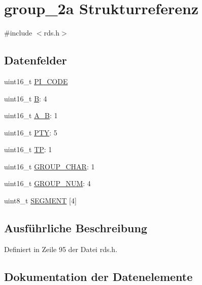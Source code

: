\hypertarget{structgroup__2a}{}\section{group\+\_\+2a Strukturreferenz}
\label{structgroup__2a}


{\ttfamily \#include $<$rds.\+h$>$}

\subsection*{Datenfelder}
\begin{DoxyCompactItemize}
\item 
uint16\+\_\+t \hyperlink{structgroup__2a_a5cd9b1f6413028425796c1129aa8fd87}{P\+I\+\_\+\+C\+O\+D\+E}
\item 
uint16\+\_\+t \hyperlink{structgroup__2a_ae783bd90764c8455228772c025c064e4}{B}\+: 4
\item 
uint16\+\_\+t \hyperlink{structgroup__2a_a226eb9a4ec1152d0c92ce7324916ad56}{A\+\_\+\+B}\+: 1
\item 
uint16\+\_\+t \hyperlink{structgroup__2a_a0474967478fbbc2c71b800d2e0132d45}{P\+T\+Y}\+: 5
\item 
uint16\+\_\+t \hyperlink{structgroup__2a_ab9e634c63b0d95a96716d5f6d7f06d72}{T\+P}\+: 1
\item 
uint16\+\_\+t \hyperlink{structgroup__2a_a66d4119990dc4c3e040a43885e9bb953}{G\+R\+O\+U\+P\+\_\+\+C\+H\+A\+R}\+: 1
\item 
uint16\+\_\+t \hyperlink{structgroup__2a_a9f692e9f76ee88348d426bcd4e9bc70b}{G\+R\+O\+U\+P\+\_\+\+N\+U\+M}\+: 4
\item 
uint8\+\_\+t \hyperlink{structgroup__2a_a51d200a5620dec8e6cd7a76c63d03ed1}{S\+E\+G\+M\+E\+N\+T} \mbox{[}4\mbox{]}
\end{DoxyCompactItemize}


\subsection{Ausführliche Beschreibung}


Definiert in Zeile 95 der Datei rds.\+h.



\subsection{Dokumentation der Datenelemente}
\hypertarget{structgroup__2a_a226eb9a4ec1152d0c92ce7324916ad56}{}
